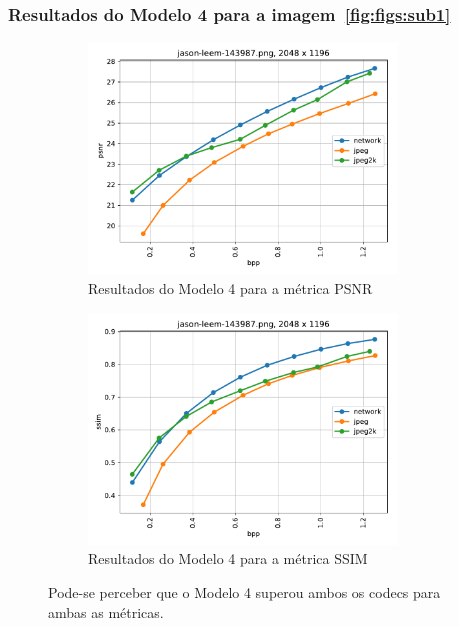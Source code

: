 \documentclass{beamer}
\begin{document}
\begin{frame}
\frametitle{Resultados do Modelo 4 para a imagem~\ref{fig:figs:sub1}}
\begin{figure}
\centering
\begin{subfigure}{.5\textwidth}
  \centering
  \includegraphics[width=0.9\textwidth]{figs/jason-leem-143987_plot_psnr.pdf}
  \caption{Resultados do Modelo 4 para a métrica PSNR}
  \label{fig:mod4_3:sub1}
\end{subfigure}%
\begin{subfigure}{.5\textwidth}
  \centering
  \includegraphics[width=0.9\textwidth]{figs/jason-leem-143987_plot_ssim.pdf}
  \caption{Resultados do Modelo 4 para a métrica SSIM}
  \label{fig:mod4_3:sub2}
\end{subfigure}
\caption{Pode-se perceber que o Modelo 4 superou ambos os codecs para ambas as métricas. }
\label{fig:mod4_3}
\end{figure}
\end{frame}
\end{document}
